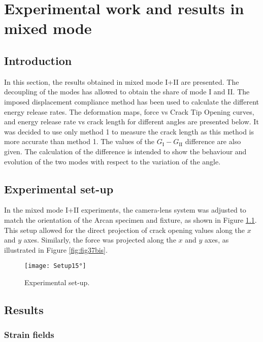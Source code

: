 \chapter{Experimental work and results in mixed mode}
\label{Chapter2}

\section{Introduction}

In this section, the results obtained in mixed mode I+II are presented. The decoupling of the modes has allowed to obtain the share of mode I and II. The imposed displacement compliance method has been used to calculate the different energy release rates. The deformation maps, force vs Crack Tip Opening curves, and energy release rate vs crack length for different angles are presented below. It was decided to use only method 1 to measure the crack length as this method is more accurate than method 1. The values of the $G_\text{I} - G_\text{II}$ difference are also given. The calculation of the difference is intended to show the behaviour and evolution of the two modes with respect to the variation of the angle.

\section{Experimental set-up}

In the mixed mode I+II experiments, the camera-lens system was adjusted to match the orientation of the Arcan specimen and fixture, as shown in Figure \ref{fig:Setup15°}. This setup allowed for the direct projection of crack opening values along the $x$ and $y$ axes. Similarly, the force was projected along the $x$ and $y$ axes, as illustrated in Figure \ref{fig:fig37bis}.

\begin{figure}[htp]
	\centering
	\texttt{[image: Setup15°]}
	\caption{Experimental set-up.}
	\label{fig:Setup15°}
\end{figure}

\section{Results}

\subsection{Strain fields}

